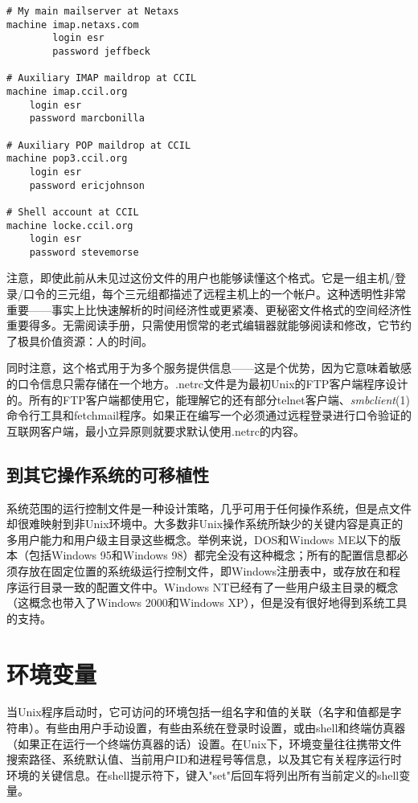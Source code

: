 \documentclass[12pt,oneside]{book}
\begin{document}
\begin{common-format}
\begin{Verbatim}[label=例10.1 .netrc例子]
# My main mailserver at Netaxs
machine imap.netaxs.com
        login esr
        password jeffbeck

# Auxiliary IMAP maildrop at CCIL
machine imap.ccil.org
    login esr
    password marcbonilla

# Auxiliary POP maildrop at CCIL
machine pop3.ccil.org
    login esr
    password ericjohnson

# Shell account at CCIL
machine locke.ccil.org
    login esr
    password stevemorse
\end{Verbatim}

注意，即使此前从未见过这份文件的用户也能够读懂这个格式。它是一组主机/登录/口令的三元组，每个三元组都描述了远程主机上的一个帐户。这种透明性非常重要——事实上比快速解析的时间经济性或更紧凑、更秘密文件格式的空间经济性重要得多。无需阅读手册，只需使用惯常的老式编辑器就能够阅读和修改，它节约了极具价值资源：人的时间。

同时注意，这个格式用于为多个服务提供信息——这是个优势，因为它意味着敏感的口令信息只需存储在一个地方。.netrc文件是为最初Unix的FTP客户端程序设计的。所有的FTP客户端都使用它，能理解它的还有部分telnet客户端、\textit{smbclient}(1)命令行工具和fetchmail程序。如果正在编写一个必须通过远程登录进行口令验证的互联网客户端，最小立异原则就要求默认使用.netrc的内容。


\subsection{到其它操作系统的可移植性}
系统范围的运行控制文件是一种设计策略，几乎可用于任何操作系统，但是点文件却很难映射到非Unix环境中。大多数非Unix操作系统所缺少的关键内容是真正的多用户能力和用户级主目录这些概念。举例来说，DOS和Windows ME以下的版本（包括Windows 95和Windows 98）都完全没有这种概念；所有的配置信息都必须存放在固定位置的系统级运行控制文件，即Windows注册表中，或存放在和程序运行目录一致的配置文件中。Windows NT已经有了一些用户级主目录的概念（这概念也带入了Windows 2000和Windows XP），但是没有很好地得到系统工具的支持。


\section{环境变量}
当Unix程序启动时，它可访问的环境包括一组名字和值的关联（名字和值都是字符串）。有些由用户手动设置，有些由系统在登录时设置，或由shell和终端仿真器（如果正在运行一个终端仿真器的话）设置。在Unix下，环境变量往往携带文件搜索路径、系统默认值、当前用户ID和进程号等信息，以及其它有关程序运行时环境的关键信息。在shell提示符下，键入"set"后回车将列出所有当前定义的shell变量。


\end{common-format}
\end{document}

